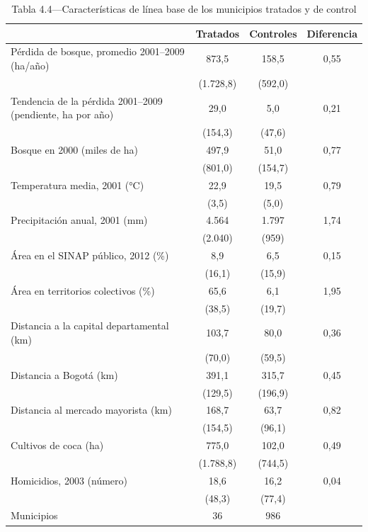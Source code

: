 \begin{table}[htbp]
\centering
\small
\caption{Tabla 4.4—Características de línea base de los municipios tratados y de control}
\label{tab:tabla_4_4}
\begin{threeparttable}
\begin{tabular}{@{}lccc@{}}
\toprule
 & Tratados & Controles & Diferencia \\
\midrule
Pérdida de bosque, promedio 2001--2009 (ha/año) & 873,5 & 158,5 & 0,55 \\
 & (1.728,8) & (592,0) &  \\
Tendencia de la pérdida 2001--2009 (pendiente, ha por año) & 29,0 & 5,0 & 0,21 \\
 & (154,3) & (47,6) &  \\
Bosque en 2000 (miles de ha) & 497,9 & 51,0 & 0,77 \\
 & (801,0) & (154,7) &  \\
Temperatura media, 2001 (°C) & 22,9 & 19,5 & 0,79 \\
 & (3,5) & (5,0) &  \\
Precipitación anual, 2001 (mm) & 4.564 & 1.797 & 1,74 \\
 & (2.040) & (959) &  \\
Área en el SINAP público, 2012 (\%) & 8,9 & 6,5 & 0,15 \\
 & (16,1) & (15,9) &  \\
Área en territorios colectivos (\%) & 65,6 & 6,1 & 1,95 \\
 & (38,5) & (19,7) &  \\
Distancia a la capital departamental (km) & 103,7 & 80,0 & 0,36 \\
 & (70,0) & (59,5) &  \\
Distancia a Bogotá (km) & 391,1 & 315,7 & 0,45 \\
 & (129,5) & (196,9) &  \\
Distancia al mercado mayorista (km) & 168,7 & 63,7 & 0,82 \\
 & (154,5) & (96,1) &  \\
Cultivos de coca (ha) & 775,0 & 102,0 & 0,49 \\
 & (1.788,8) & (744,5) &  \\
Homicidios, 2003 (número) & 18,6 & 16,2 & 0,04 \\
 & (48,3) & (77,4) &  \\
\midrule
Municipios & 36 & 986 &  \\
\bottomrule
\end{tabular}

\end{threeparttable}
\end{table}
